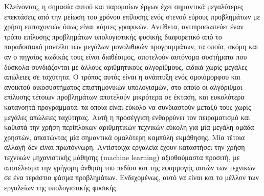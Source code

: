 Κλείνοντας, η σημασία αυτού και παρομοίων έργων έχει σημαντικά μεγαλύτερες επεκτάσεις από την μείωση του χρόνου επίλυσης ενός στενού εύρους προβλημάτων με χρήση επιταχυντών όπως είναι κάρτες γραφικών.
Αντίθετα, αντιπροσωπεύει έναν τρόπο επίλυσης προβλημάτων υπολογιστικής φυσικής διαφορετικό από το παραδοσιακό μοντέλο των μεγάλων μονολιθικών προγραμμάτων, τα οποία, ακόμη και αν ο πηγαίος κωδικάς τους είναι διαθέσιμος, αποτελούν αυτόνομα συστήματα που δύσκολα συνδιάζονται με άλλους αριθμητικούς αλγορίθμους, ειδικά χωρίς μεγάλες απώλειες σε ταχύτητα.
Ο τρόπος αυτός είναι η ανάπτυξη ενός ομοιόμορφου και ανοικτού οικοσυστήματος επιστημονικών υπολογισμών, στο οποίο οι αλγόριθμοι επίλυσης τέτοιων προβλημάτων αποτελούν μικρότερα σε έκταση, και ευκολότερα κατανοητά προγράμματα, τα οποία είναι εύκολο να συνδιαστούν μεταξύ τους χωρίς μεγάλες απώλειες ταχύτητας.
Αυτή η προσέγγιση ενθαρρύνει τον πειραματισμό και καθιστά την χρήση περίπλοκων αριθμητικών τεχνικών εύκολη για μία μεγάλη ομάδα χρηστών, απαιτώντας μία σημαντικά ομαλότερη καμπύλη εκμάθησης.
Μία τέτοια αλλαγή δεν είναι πρωτόγνωρη.
Αντίστοιχα εργαλεία έχουν καταστήσει την χρήση τεχνικών μηχανιστικής μάθησης (machine learning) αξιοθαύμαστα προσιτή, με αποτέλεσμα την γρήγορη άνθηση του πεδίου και της εφαρμογής αυτών των τεχνικών σε ένα τεράστιο φάσμα προβλημάτων.
Ενδεχομένως, αυτό να είναι και το μέλλον των εργαλείων της υπολογιστικής φυσικής.


